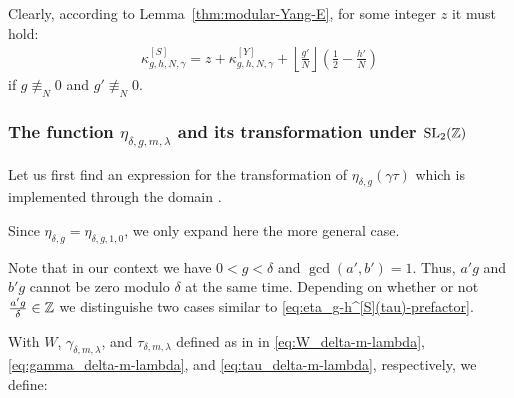 \documentclass{article}
\begin{document}
Clearly, according to Lemma~\ref{thm:modular-Yang-E}, for some integer
$z$ it must hold:
\begin{gather*}
  \kappa_{g,h,N,\gamma}^{[S]}
  =
  z + \kappa_{g,h,N,\gamma}^{[Y]}
    + \left\lfloor\frac{g'}{N} \right\rfloor
      \left(\frac{1}{2} - \frac{h'}{N}\right)
\end{gather*}
if $g\not\equiv_N 0$ and $g'\not\equiv_N 0$.


\subsubsection{The function $\eta_{\delta,g,m,\lambda}$ and its
  transformation under $\SL2Z$}
\label{sec:[eta-delta-g-m-lambda-gamma-tau-Robins}

Let us first find an expression for the transformation of
$\eta_{\delta,g}(\gamma\tau)$ which is implemented through the domain
.

Since $\eta_{\delta,g}=\eta_{\delta,g,1,0}$, we only expand here the
more general case.

Note that in our context we have $0 < g < \delta$ and
$\gcd(a', b')=1$. Thus, $a'g$ and $b'g$ cannot be zero modulo $\delta$
at the same time.
Depending on whether or not $\frac{a' g}{\delta}\in\mathbb{Z}$ we
distinguishe two cases similar to \eqref{eq:eta_g-h^[S](tau)-prefactor}.

With $W$, $\gamma_{\delta,m,\lambda}$, and $\tau_{\delta,m,\lambda}$
defined as in in \eqref{eq:W_delta-m-lambda},
\eqref{eq:gamma_delta-m-lambda}, and \eqref{eq:tau_delta-m-lambda},
respectively, we define:
\end{document}
